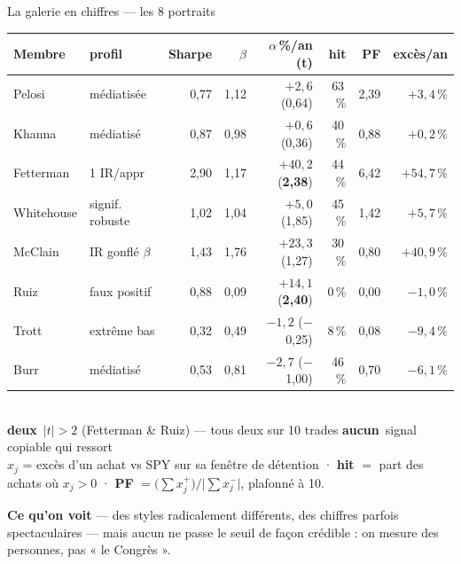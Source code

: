 \documentclass[11pt,aspectratio=169]{beamer}
\newcommand{\kpi}[3]{{\large\textbf{\textcolor{#1}{#2}}}~{\footnotesize #3}}
\newcommand{\defl}[1]{{\scriptsize\color{black!55}#1}}
\newcommand{\repband}[1]{%
  \colorbox{okgreen!12}{\parbox{\dimexpr\textwidth-10pt}{\scriptsize
    \textbf{\textcolor{okgreen}{Ce qu'on voit}}\; --- #1}}}
\begin{document}
\begin{frame}{La galerie en chiffres — les 8 portraits}
  \centering
  {\footnotesize
  \begin{tabular}{@{}l l r r r r r r@{}}
    \toprule
    Membre & profil & Sharpe & $\beta$ & $\alpha$\,\%/an (t) & hit & PF & excès/an\\\midrule
    Pelosi     & médiatisée       & 0,77 & 1,12 & $+2{,}6$ (0,64)    & 63\,\% & 2,39 & $+3{,}4\,\%$\\
    Khanna     & médiatisé        & 0,87 & 0,98 & $+0{,}6$ (0,36)    & 40\,\% & 0,88 & $+0{,}2\,\%$\\
    Fetterman  & 1\up{er} IR/appr & 2,90 & 1,17 & $+40{,}2$ (\textbf{2,38}) & 44\,\% & 6,42 & $+54{,}7\,\%$\\
    Whitehouse & signif. robuste  & 1,02 & 1,04 & $+5{,}0$ (1,85)    & 45\,\% & 1,42 & $+5{,}7\,\%$\\
    McClain    & IR gonflé $\beta$ & 1,43 & 1,76 & $+23{,}3$ (1,27)  & 30\,\% & 0,80 & $+40{,}9\,\%$\\
    Ruiz       & faux positif     & 0,88 & 0,09 & $+14{,}1$ (\textbf{2,40}) & \phantom{0}0\,\% & 0,00 & $-1{,}0\,\%$\\
    Trott      & extrême bas      & 0,32 & 0,49 & $-1{,}2$ ($-$0,25) & \phantom{0}8\,\% & 0,08 & $-9{,}4\,\%$\\
    Burr       & médiatisé        & 0,53 & 0,81 & $-2{,}7$ ($-$1,00) & 46\,\% & 0,70 & $-6{,}1\,\%$\\
    \bottomrule
  \end{tabular}}\\[2mm]
  \kpi{helec}{deux}{$|t|>2$ (Fetterman \& Ruiz) — tous deux sur 10 trades}\hspace{6mm}%
  \kpi{grisC}{aucun}{signal copiable qui ressort}\\[1.5mm]
  \defl{$x_j$ = excès d'un achat vs SPY sur sa fenêtre de détention · \textbf{hit} $=$ part des achats où $x_j>0$ · \textbf{PF} $=\bigl(\textstyle\sum x_j^{+}\bigr)\big/\bigl|\textstyle\sum x_j^{-}\bigr|$, plafonné à 10.}\\[1mm]
  \repband{des styles radicalement différents, des chiffres parfois spectaculaires — mais aucun ne passe le seuil de façon crédible : on mesure des personnes, pas « le Congrès ».}
\end{frame}
\end{document}
